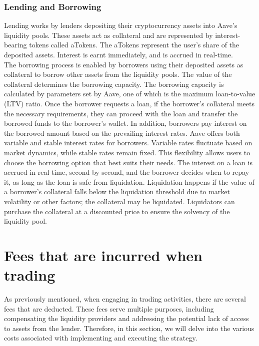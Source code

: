 \subsubsection{Lending and Borrowing}
Lending works by lenders depositing their cryptocurrency assets into Aave's liquidity pools. These assets act as collateral and are represented by interest-bearing tokens called aTokens. The aTokens represent the user's share of the deposited assets. Interest is earnt immediately, and is accrued in real-time.
\\[3mm]
The borrowing process is enabled by borrowers using their deposited assets as collateral to borrow other assets from the liquidity pools. The value of the collateral determines the borrowing capacity. The borrowing capacity is calculated by parameters set by Aave, one of which is the maximum loan-to-value (LTV) ratio. Once the borrower requests a loan, if the borrower's collateral meets the necessary requirements, they can proceed with the loan and transfer the borrowed funds to the borrower's wallet. In addition, borrowers pay interest on the borrowed amount based on the prevailing interest rates. Aave offers both variable and stable interest rates for borrowers. Variable rates fluctuate based on market dynamics, while stable rates remain fixed. This flexibility allows users to choose the borrowing option that best suits their needs. The interest on a loan is accrued in real-time, second by second, and the borrower decides when to repay it, as long as the loan is safe from liquidation. Liquidation happens if the value of a borrower's collateral falls below the liquidation threshold due to market volatility or other factors; the collateral may be liquidated. Liquidators can purchase the collateral at a discounted price to ensure the solvency of the liquidity pool.

\section{Fees that are incurred when trading}
As previously mentioned, when engaging in trading activities, there are several fees that are deducted. These fees serve multiple purposes, including compensating the liquidity providers and addressing the potential lack of access to assets from the lender. Therefore, in this section, we will delve into the various costs associated with implementing and executing the strategy.

